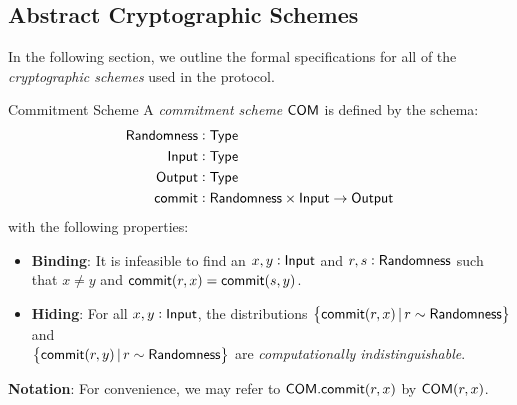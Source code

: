
\subsection{Abstract Cryptographic Schemes}

In the following section, we outline the formal specifications for all of the \emph{cryptographic schemes} used in the \MantaPay{} protocol.

\begin{definitiontoc}{Commitment Scheme}
    A \emph{commitment scheme} ${\textsf{COM}}$ is defined by the schema:
    \begin{align*}
        {\textsf{Randomness}}             &: {\textsf{Type}} \\
        {\textsf{Input}}                  &: {\textsf{Type}} \\
        {\textsf{Output}}                 &: {\textsf{Type}} \\
        {\textsf{commit}}                 &: {\textsf{Randomness}} \times {\textsf{Input}} \to {\textsf{Output}}
    \end{align*}
    with the following properties:
    \begin{itemize}
        \item \textbf{Binding}: It is infeasible to find an $x, y : {\textsf{Input}}$ and $r, s: {\textsf{Randomness}}$ such that $x \ne y$ and ${\textsf{commit}}(r,x) = {\textsf{commit}}(s,y)$.
        \item \textbf{Hiding}: For all $x, y : {\textsf{Input}}$, the distributions $\set{{\textsf{commit}}(r,x) \,|\, r \sim {\textsf{Randomness}}}$ and \\ $\set{{\textsf{commit}}(r,y) \,|\, r \sim {\textsf{Randomness}}}$ are \emph{computationally indistinguishable}.
    \end{itemize}
    \textbf{Notation}: For convenience, we may refer to ${\textsf{COM}}.{\textsf{commit}}(r,x)$ by ${\textsf{COM}}(r, x)$.
\end{definitiontoc}

